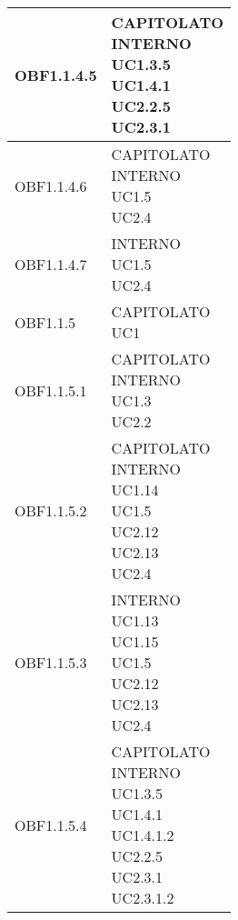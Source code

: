 \documentclass{scalatekids-article}
\begin{document}
\begin{longtable}[H]{|p{5.5cm}|p{5.5cm}|}
  \hline
  OBF1.1.4.5 & \multiLineCell[t]{CAPITOLATO\\INTERNO\\UC1.3.5\\UC1.4.1\\UC2.2.5\\UC2.3.1\\}\\
  \hline
  OBF1.1.4.6 & \multiLineCell[t]{CAPITOLATO\\INTERNO\\UC1.5\\UC2.4\\}\\
  \hline
  OBF1.1.4.7 & \multiLineCell[t]{INTERNO\\UC1.5\\UC2.4\\}\\
  \hline
  OBF1.1.5 & \multiLineCell[t]{CAPITOLATO\\UC1\\}\\
  \hline
  OBF1.1.5.1 & \multiLineCell[t]{CAPITOLATO\\INTERNO\\UC1.3\\UC2.2\\}\\
  \hline
  OBF1.1.5.2 & \multiLineCell[t]{CAPITOLATO\\INTERNO\\UC1.14\\UC1.5\\UC2.12\\UC2.13\\UC2.4\\}\\
  \hline
  OBF1.1.5.3 & \multiLineCell[t]{INTERNO\\UC1.13\\UC1.15\\UC1.5\\UC2.12\\UC2.13\\UC2.4\\}\\
  \hline
  OBF1.1.5.4 & \multiLineCell[t]{CAPITOLATO\\INTERNO\\UC1.3.5\\UC1.4.1\\UC1.4.1.2\\UC2.2.5\\UC2.3.1\\UC2.3.1.2\\}\\

\end{longtable}
\end{document}
